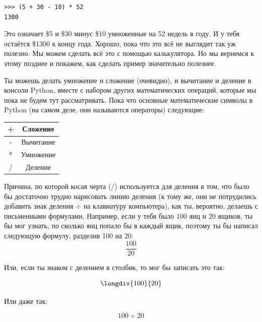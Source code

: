 \begin{listing}
\begin{verbatim}
>>> (5 + 30 - 10) * 52
1300
\end{verbatim}
\end{listing}

Это означает \$5 и \$30 минус \$10 умноженные на 52 недель в году.  И у тебя остаётся \$1300 к концу года. Хорошо, пока что это всё не выглядит так уж полезно.  Мы можем сделать всё это с помощью калькулятора.  Но мы вернемся к этому позднее и покажем, как сделать пример значительно полезнее.

Ты можешь делать умножение и сложение (очевидно), и вычитание и деление в консоли Python, вместе с набором других математических операций, которые мы пока не будем тут рассматривать. Пока что основные математические символы в Python (на самом деле, они называются операторы) следующие:

\begin{center}
\begin{tabular}{|c|c|}
\hline
+ & Сложение \\
\hline
- & Вычитание \\
\hline
* & Умножение \\
\hline
/ & Деление \\
\hline
\end{tabular}
\end{center}

Причина, по которой косая черта (/) используется для деления в том, что было бы достаточно трудно нарисовать линию деления (к тому же, они не потрудились добавить знак деления $\div$ на клавиатуру компьютера), как ты, вероятно, делаешь с письменными формулами. Например, если у тебя было 100 яиц и 20 ящиков, ты бы мог узнать, по сколько яиц попало бы в каждый ящик, поэтому ты бы написал следующую формулу, разделив 100 на 20:
\begin{displaymath}
\frac{100}{20}
\end{displaymath}

Или, если ты знаком с делением в столбик, то мог бы записать это так:

\begin{displaymath}
\longdiv{100}{20}
\end{displaymath}

Или даже так:

\begin{displaymath}
100 \div 20
\end{displaymath}

